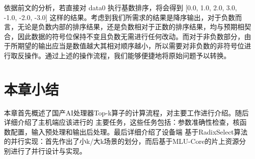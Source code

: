 依据前文的分析，若直接对 data0 执行基数排序，将会得到 [0.0, 1.0, 2.0, 3.0, -1.0, -2.0, -3.0] 这样的结果。考虑到我们所需求的结果是降序输出，对于负数而言，无论是负数内部的排序结果，还是负数相对于正数的排序结果，均与预期相契合，因此数据的符号位保持不变且负数无需进行任何改动。而对于非负数部分，由于所期望的输出应当是数值越大其相对顺序越小，所以需要对非负数的非符号位进行取反操作。通过上述的操作流程，我们能够便捷地将原始问题予以转换。 



\section{本章小结}
本章首先概述了国产AI处理器Top-k算子的计算流程，对主要工作进行介绍。随后详细介绍了主机端应该进行的
主要任务，这些任务包括：参数准确性检查，核函数配置，输入预处理和输出后处理。最后详细介绍了设备端
基于RadixSelect算法的并行实现：首先作出了小k/大k场景的划分，而后基于MLU-Core的片上资源分别进行了并行设计与实现。